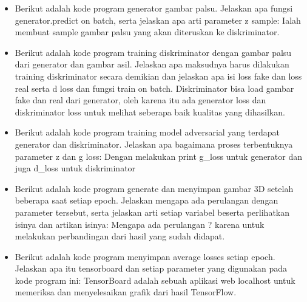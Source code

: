\begin{enumerate}
\begin{itemize}
		

        	\item Berikut adalah kode program generator gambar palsu. Jelaskan apa fungsi generator.predict on batch, serta jelaskan apa arti parameter z sample:
Ialah membuat sample gambar palsu yang akan diteruskan ke diskriminator.

		

        	\item Berikut adalah kode program training diskriminator dengan gambar palsu dari generator dan gambar asil. Jelaskan apa maksudnya harus dilakukan training diskriminator secara demikian dan jelaskan apa isi loss fake dan loss real serta d loss dan fungsi train on batch.
Diskriminator bisa load gambar fake dan real dari generator, oleh karena itu ada generator loss dan diskriminator loss untuk melihat seberapa baik kualitas yang dihasilkan.

		

        	\item Berikut adalah kode program training model adversarial yang terdapat generator dan diskriminator. Jelaskan apa bagaimana proses terbentuknya parameter z dan g loss:
Dengan melakukan print g_loss untuk generator dan juga d_loss untuk diskriminator

		

        	\item Berikut adalah kode program generate dan menyimpan gambar 3D setelah beberapa saat setiap epoch. Jelaskan mengapa ada perulangan dengan parameter tersebut, serta jelaskan arti setiap variabel beserta perlihatkan isinya dan artikan isinya:
Mengapa ada perulangan ? karena untuk melakukan perbandingan dari hasil yang sudah didapat.

		

        	\item Berikut adalah kode program menyimpan average losses setiap epoch. Jelaskan apa itu tensorboard dan setiap parameter yang digunakan pada kode program ini:
TensorBoard adalah sebuah aplikasi web localhost untuk memeriksa dan menyelesaikan grafik dari hasil TensorFlow.

		


\end{itemize}
\end{enumerate}

